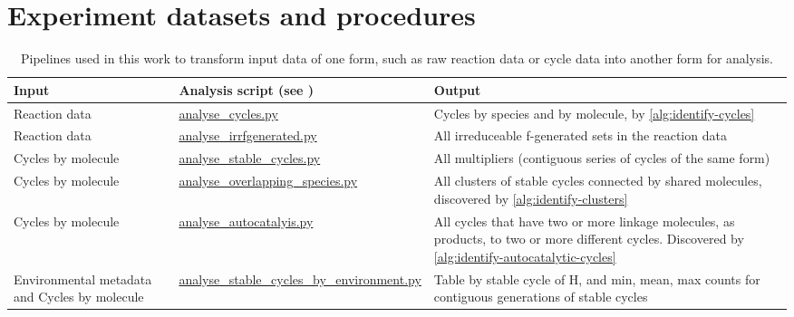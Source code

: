 \chapter{Experiment datasets and procedures}\label{datasets}

\begin{table}
	\scriptsize
	\begin{center}
		\caption{Pipelines used in this work to transform input data of one form, such as raw reaction data or cycle data into another form for analysis.}\label{tbl:datasets}
		\begin{tabular}{p{4cm}p{4cm}p{5cm}}
			\toprule
			Input & Analysis script (see \cite{toyworld2}) & Output\\
			\midrule
			Reaction data 									& \url{analyse_cycles.py}						& Cycles by species and by molecule, by \cref{alg:identify-cycles} \\ %
			Reaction data									& \url{analyse_irrfgenerated.py}				& All irreduceable f-generated sets in the reaction data\\ %
			\midrule
			Cycles by molecule								& \url{analyse_stable_cycles.py}				& All multipliers (contiguous series of cycles of the same form)\\ %
			Cycles by molecule								& \url{analyse_overlapping_species.py}			& All clusters of stable cycles connected by shared molecules, discovered by \cref{alg:identify-clusters}\\ %
			Cycles by molecule								& \url{analyse_autocatalyis.py}					& All cycles that have two or more linkage molecules, as products, to two or more different cycles. Discovered by \cref{alg:identify-autocatalytic-cycles}\\ %
			\midrule
			Environmental metadata and Cycles by molecule	& \url{analyse_stable_cycles_by_environment.py}	& Table by stable cycle of H, and min, mean, max counts for contiguous generations of stable cycles\\
			\bottomrule
		\end{tabular}
	\end{center}
\end{table}

